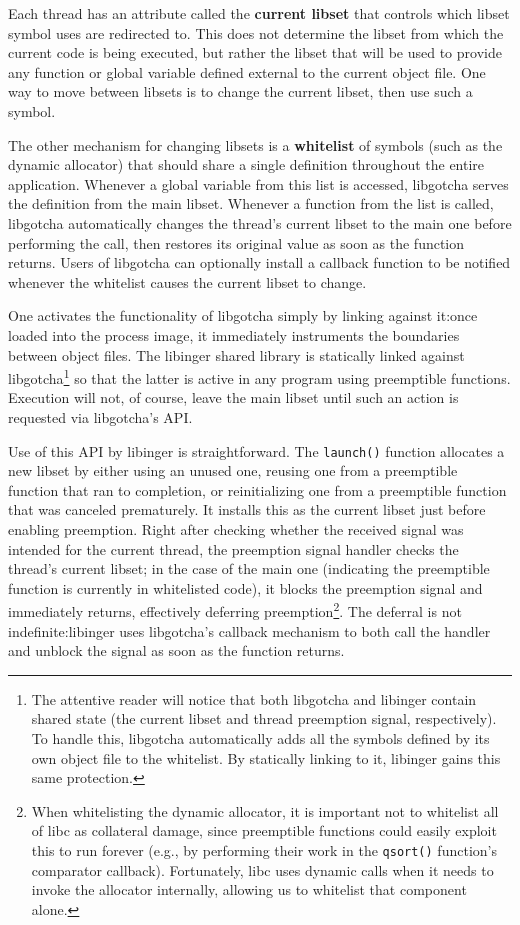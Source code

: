 Each thread has an attribute called the \textbf{current libset} that controls which
libset symbol uses are redirected to.  This does not determine the libset from which
the current code is being executed, but rather the libset that will be used to
provide any function or global variable defined external to the current object file.
One way to move between libsets is to change the current libset, then use such a
symbol.

The other mechanism for changing libsets is a \textbf{whitelist} of symbols (such as
the dynamic allocator) that should share a single definition throughout the entire
application.  Whenever a global variable from this list is accessed, libgotcha serves
the definition from the main libset.  Whenever a function from the list is called,
libgotcha automatically changes the thread's current libset to the main one before
performing the call, then restores its original value as soon as the function
returns.  Users of libgotcha can optionally install a callback function to be
notified whenever the whitelist causes the current libset to change.

One activates the functionality of libgotcha simply by linking against it:\@ once
loaded into the process image, it immediately instruments the boundaries between
object files.  The libinger shared library is statically linked against
libgotcha\footnote{The attentive reader will notice that both libgotcha and libinger
contain shared state (the current libset and thread preemption signal, respectively).
To handle this, libgotcha automatically adds all the symbols defined by its own
object file to the whitelist.  By statically linking to it, libinger gains this same
protection.} so that the latter is active in any program using preemptible functions.
Execution will not, of course, leave the main libset until such an action is
requested via libgotcha's API.

Use of this API by libinger is straightforward.  The \texttt{launch()} function
allocates a new libset by either using an unused one, reusing one from a preemptible
function that ran to completion, or reinitializing one from a preemptible function
that was canceled prematurely.  It installs
this as the current libset just before enabling preemption.  Right after checking
whether the received signal was intended for the current thread, the preemption
signal handler checks the thread's current libset; in the case of the main one
(indicating the preemptible function is currently in whitelisted code), it blocks the
preemption signal and immediately returns, effectively deferring
preemption\footnote{When whitelisting the dynamic allocator, it is important not to
whitelist all of libc as collateral damage, since preemptible functions could easily
exploit this to run forever (e.g., by performing their work in the \texttt{qsort()}
function's comparator callback).  Fortunately, libc uses dynamic calls when it needs
to invoke the allocator internally, allowing us to whitelist that component alone.}.
The deferral is not indefinite:\@ libinger uses libgotcha's callback mechanism to
both call the handler and unblock the signal as soon as the function returns.

